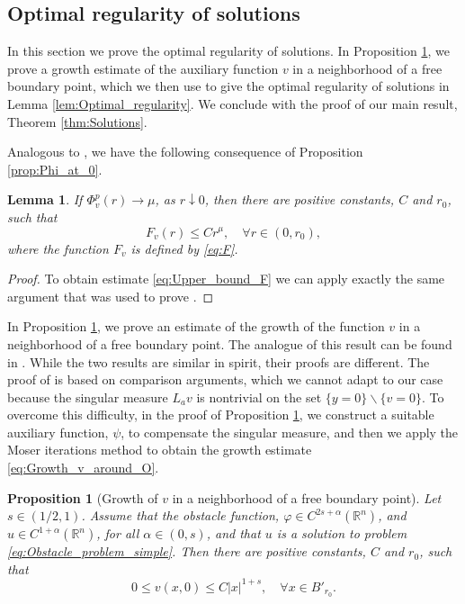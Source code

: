 \documentclass[11pt,reqno]{amsart}
\newtheorem{lem}[thm]{Lemma}
\newtheorem{prop}[thm]{Proposition}
\theoremstyle{definition}
\theoremstyle{remark}
\begin{document}
\subsection{Optimal regularity of solutions}
\label{sec:Solutions_optimal_regularity}
In this section we prove the optimal regularity of solutions. In Proposition \ref{prop:Growth_v_around_0}, we prove a growth estimate of the auxiliary function $v$ in a neighborhood of a free boundary point, which we then use to give the optimal regularity of solutions in Lemma \ref{lem:Optimal_regularity}. We conclude with the proof of our main result, Theorem \ref{thm:Solutions}.

Analogous to \cite[Lemma 6.6]{Caffarelli_Salsa_Silvestre_2008}, we have the following consequence of Proposition \ref{prop:Phi_at_0}.
\begin{lem}
\label{lem:Upper_bound_F}
If $\Phi^p_v(r)\rightarrow \mu$, as $r\downarrow 0$, then there are positive constants, $C$ and $r_0$, such that
\begin{equation}
\label{eq:Upper_bound_F} 
F_v(r) \leq C r^{\mu},\quad\forall r\in (0,r_0),
\end{equation}
where the function $F_v$ is defined by \eqref{eq:F}.
\end{lem}

\begin{proof}
To obtain estimate \eqref{eq:Upper_bound_F} we can apply exactly the same argument that was used to prove \cite[Lemma 6.6]{Caffarelli_Salsa_Silvestre_2008}.
\end{proof}

In Proposition \ref{prop:Growth_v_around_0}, we prove an estimate of the growth of the function $v$ in a neighborhood of a free boundary point. The analogue of this result can be found in \cite[Lemma 6.5]{Caffarelli_Salsa_Silvestre_2008}. While the two results  are similar in spirit, their proofs are different. The proof of \cite[Lemma 6.5]{Caffarelli_Salsa_Silvestre_2008} is based on comparison arguments, which we cannot adapt to our case because the singular measure $L_a v$ is nontrivial on the set $\{y=0\}\backslash\{v=0\}$. To overcome this difficulty, in the proof of Proposition \ref{prop:Growth_v_around_0}, we construct a suitable auxiliary function, $\psi$, to compensate the singular measure, and then we apply the Moser iterations method to obtain the growth estimate \eqref{eq:Growth_v_around_O}. 
\begin{prop}[Growth of $v$ in a neighborhood of a free boundary point]
\label{prop:Growth_v_around_0}
Let $s\in (1/2,1)$. Assume that the obstacle function, $\varphi \in C^{2s+\alpha}({\mathbb{R}}^n)$, and $u\in C^{1+\alpha}({\mathbb{R}}^n)$, for all $\alpha\in (0,s)$, and that $u$ is a solution to problem \eqref{eq:Obstacle_problem_simple}. Then there are positive constants, $C$ and $r_0$, such that
\begin{equation}
\label{eq:Growth_v_around_O}
0 \leq v(x,0) \leq C|x|^{1+s},\quad\forall x \in B'_{r_0}.
\end{equation}
\end{prop}
\end{document}
